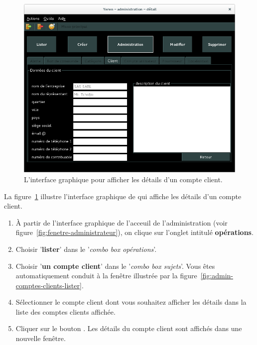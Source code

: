 

\begin{figure}[!htpb]
	\centering
	\includegraphics[scale=0.45]{images/compte-client-afficher-details.png}
	\caption{L'interface graphique pour afficher les d\'etails d'un compte client.}
	\label{fig:admin-compte-client-afficher-details}
\end{figure}

La figure~\ref{fig:admin-compte-client-afficher-details}
illustre l'interface graphique de \yeroth qui affiche les
d\'etails d'un compte client.

\begin{enumerate}[1)]
	\item \`A partir de l'interface graphique de l'acceuil de
		l'administration (voir figure~\ref{fig:fenetre-administrateur}),
		on clique sur l'onglet intitul\'e \textbf{op\'erations}. 
		
	\item Choisir '\textbf{lister}' dans le '\emph{combo box
		op\'erations}'.
		
	\item Choisir '\textbf{un compte client}' dans le '\emph{combo box
		sujets}'. Vous \^etes automatiquement conduit \`a la fen\^etre
		illustr\'ee par la figure~\ref{fig:admin-comptes-clients-lister}.
		
	\item S\'electionner le compte client dont vous souhaitez afficher
		les d\'etails dans la liste des comptes clients affich\'ee.
		
	\item Cliquer sur le bouton . Les d\'etails
		du compte client sont affich\'es dans une nouvelle fen\^etre.
\end{enumerate}

